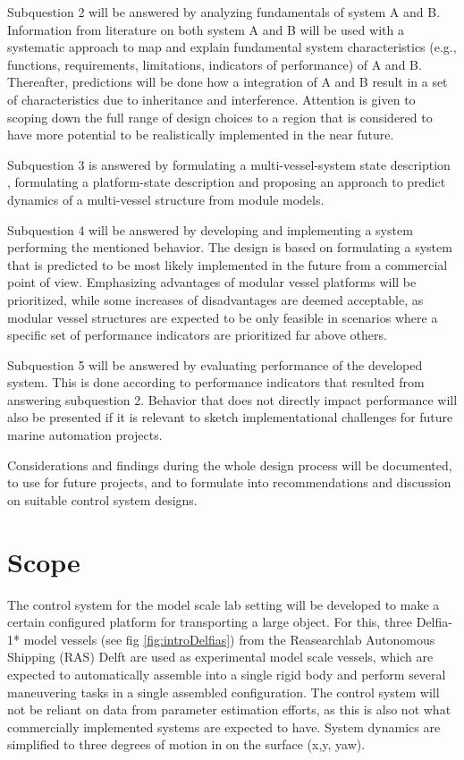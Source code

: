 Subquestion 2 will be answered by analyzing fundamentals of system A and B. Information from literature on both system A and B will be used with a systematic approach to map and explain fundamental system characteristics (e.g., functions, requirements, limitations, indicators of performance) of A and B. 
Thereafter, predictions will be done how a integration of A and B result in a set of characteristics due to inheritance and interference. Attention is given to scoping down the full range of design choices to a region that is considered to have more potential to be realistically implemented in the near future. 

Subquestion 3 is answered by formulating a multi-vessel-system state description , formulating a platform-state description and proposing an approach to predict dynamics of a multi-vessel structure from module models. 

Subquestion 4 will be answered by developing and implementing a system performing the mentioned behavior. The design is based on formulating a system that is predicted to be most likely implemented in the future from a commercial point of view.  Emphasizing advantages of modular vessel platforms will be prioritized, while some increases of disadvantages are deemed acceptable, as modular vessel structures are expected to be only feasible in scenarios where a specific set of performance indicators are prioritized far above others. 

Subquestion 5 will be answered by evaluating performance of the developed system. This is done according to performance indicators that resulted from answering subquestion 2. Behavior that does not directly impact performance will also be presented if it is relevant to sketch implementational challenges for future marine automation projects. 

Considerations and findings during the whole design process will be documented, to use for future projects, and to formulate into recommendations and discussion on suitable control system designs.

\section{Scope}
The control system for the model scale lab setting will be developed to make a certain configured platform for transporting a large object. For this, three Delfia-1* model vessels (see fig \ref{fig:introDelfias}) from the Reasearchlab Autonomous Shipping (RAS) Delft are used as experimental model scale vessels, which are expected to automatically assemble into a single rigid body and perform several maneuvering tasks in a single assembled configuration. The control system will not be reliant on data from parameter estimation efforts, as this is also not what commercially implemented systems are expected to have. System dynamics are simplified to three degrees of motion in on the surface (x,y, yaw).

